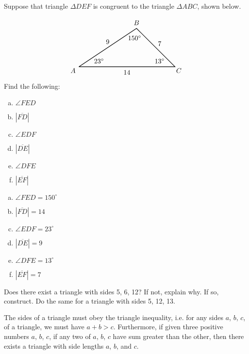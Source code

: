 \documentclass[11pt,letterpaper]{article}
\begin{document}

 Suppose that triangle $\Delta DEF$ is congruent to the triangle $\Delta ABC$, shown below. \par
	\[
	\begin{tikzpicture}
	\draw[line width=0.03cm] (0,0) -- (3,2) -- (5,0) -- (0,0);
	\node at (-0.3,-0.2) {$A$};
	\node at (3,2.3) {$B$};
	\node at (5.2,-0.2) {$C$};
	\node at (1.5,1.3) {$9$}; 
	\node at (4.2,1.2) {$7$}; 
	\node at (2.5,-0.3) {$14$}; 
	\node at (1.05,0.3) {$23^\circ$};
	\node at (4.2,0.3) {$13^\circ$};
	\node at (2.9,1.5) {$150^\circ$};
	\end{tikzpicture}
	\]
Find the following:
	\begin{enumerate}[(a)]
	\item $\angle FED$
	\item $|\overline{FD}|$
	\item $\angle EDF$
	\item $|\overline{DE}|$
	\item $\angle DFE$
	\item $|\overline{EF}|$
	\end{enumerate} \pspace

\sol 
\begin{enumerate}[(a)]
\item $\angle FED= 150^\circ$
\item $|\overline{FD}|= 14$
\item $\angle EDF= 23^\circ$
\item $|\overline{DE}|= 9$
\item $\angle DFE= 13^\circ$
\item $|\overline{EF}|= 7$
\end{enumerate}



\newpage



 Does there exist a triangle with sides 5, 6, 12? If not, explain why. If so, construct. Do the same for a triangle with sides 5, 12, 13. \pspace

\sol The sides of a triangle must obey the triangle inequality, i.e. for any sides $a$, $b$, $c$, of a triangle, we must have $a + b > c$. Furthermore, if given three positive numbers $a$, $b$, $c$, if any two of $a$, $b$, $c$ have sum greater than the other, then there exists a triangle with side lengths $a$, $b$, and $c$. \pspace
\end{document}
